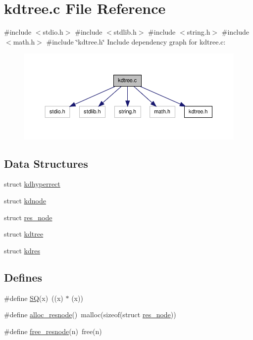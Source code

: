 \hypertarget{a00013}{\section{kdtree.\-c \-File \-Reference}
\label{d7/dd4/a00013}
}
{\ttfamily \#include $<$stdio.\-h$>$}\*
{\ttfamily \#include $<$stdlib.\-h$>$}\*
{\ttfamily \#include $<$string.\-h$>$}\*
{\ttfamily \#include $<$math.\-h$>$}\*
{\ttfamily \#include \char`\"{}kdtree.\-h\char`\"{}}\*
\-Include dependency graph for kdtree.\-c\-:\nopagebreak
\begin{figure}[H]
\begin{center}
\leavevmode
\includegraphics[width=350pt]{d3/d52/a00023}
\end{center}
\end{figure}
\subsection*{\-Data \-Structures}
\begin{DoxyCompactItemize}
\item 
struct \hyperlink{a00008}{kdhyperrect}
\item 
struct \hyperlink{a00009}{kdnode}
\item 
struct \hyperlink{a00012}{res\-\_\-node}
\item 
struct \hyperlink{a00011}{kdtree}
\item 
struct \hyperlink{a00010}{kdres}
\end{DoxyCompactItemize}
\subsection*{\-Defines}
\begin{DoxyCompactItemize}
\item 
\#define \hyperlink{a00013_ac3644f84794a8bfdacf39c4b2c2495fc_ac3644f84794a8bfdacf39c4b2c2495fc}{\-S\-Q}(x)~((x) $\ast$ (x))
\item 
\#define \hyperlink{a00013_aeb41ddbd68313adcb5129add2c4428d0_aeb41ddbd68313adcb5129add2c4428d0}{alloc\-\_\-resnode}()~malloc(sizeof(struct \hyperlink{a00012}{res\-\_\-node}))
\item 
\#define \hyperlink{a00013_aa809c41131ed043aab5ea2f7806fa458_aa809c41131ed043aab5ea2f7806fa458}{free\-\_\-resnode}(n)~free(n)
\end{DoxyCompactItemize}
